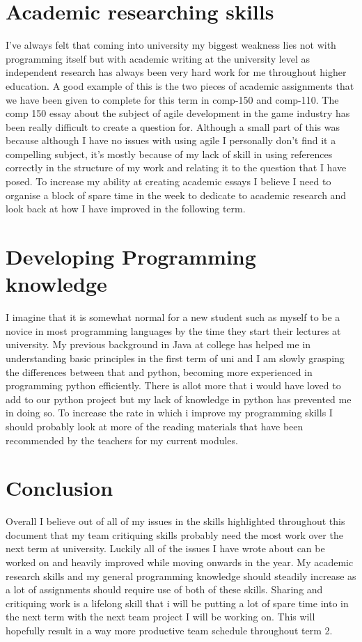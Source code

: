\documentclass{scrartcl}
\begin{document}
\section{Academic researching skills}

I've always felt that coming into university my biggest weakness lies not with programming itself but with academic writing at the university level as independent research has always been very hard work for me throughout higher education. A good example of this is the two pieces of academic assignments that we have been given to complete for this term in comp-150 and comp-110. The comp 150 essay about the subject of agile development in the game industry has been really difficult to create a question for. Although a small part of this was because although I have no issues with using agile I personally don't find it a compelling subject, it's mostly because of my lack of skill in using references correctly in the structure of my work and relating it to the question that I have posed. To increase my ability at creating academic essays I believe I need to organise a block of spare time in the week to dedicate to academic research and look back at how I have improved in the following term.
\section{Developing Programming knowledge}

I imagine that it is somewhat normal for a new student such as myself to be a novice in most programming languages by the time they start their lectures at university. My previous background in Java at college has helped me in understanding basic principles in the first term of uni and I am slowly grasping the differences between that and python, becoming more experienced in programming python efficiently. There is allot more that i would have loved to add to our python project but my lack of knowledge in python has prevented me in doing so. To increase the rate in which i improve my programming skills I should probably look at more of the reading materials that have been recommended by the teachers for my current modules. 


\section{Conclusion}

Overall I believe out of all of my issues in the skills highlighted throughout this document that my team critiquing skills probably need the most work over the next term at university. Luckily all of the issues I have wrote about can be worked on and heavily improved while moving onwards in the year. My academic research skills and my general programming knowledge should steadily increase as a lot of assignments should require use of both of these skills. Sharing and critiquing work is a lifelong skill that i will be putting a lot of spare time into in the next term with the next team project I will be working on. This will hopefully result in a way more productive team schedule throughout term 2.  



\end{document}
